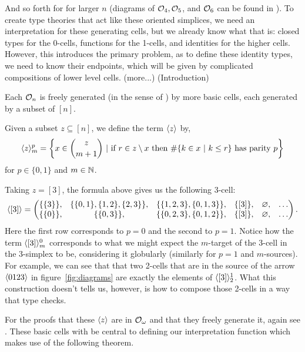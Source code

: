 \documentclass{article}
\begin{document}
And so forth for for larger $n$ (diagrams of $\mathcal{O}_4,\mathcal{O}_5$, and $\mathcal{O}_6$ can be found in \cite{Street}). To create type theories that act like these oriented simplices, we need an interpretation for these generating cells, but we already know what that is: closed types for the 0-cells, functions for the 1-cells, and identities for the higher cells. However, this introduces the primary problem, as to define these identity types, we need to know their endpoints, which will be given by complicated compositions of lower level cells. (more...) (Introduction)

Each $\mathcal{O}_n$ is freely generated (in the sense of \cite[\S 4]{Street}) by more basic cells, each generated by a subset of $[n]$.

\begin{defn}
    Given a subset $z\subseteq[n]$, we define the term $\langle z\rangle$ by,
    $$ \gen{z}_m^p=\left\{x\in{\binom z{m+1}}\ |\ \text{if }r\in z\setminus x\text{ then }\#\{k\in x\ |\ k\leq r\}\text{ has parity }p\right\} $$
    for $p\in\{0,1\}$ and $m\in\mathbb{N}$.
\end{defn}

\begin{ex}
    Taking $z=[3]$, the formula above gives us the following 3-cell:
    $$ \langle[3]\rangle=\begin{pmatrix}
        \{\{3\}\}, & \{\{0,1\},\{1,2\},\{2,3\}\}, & \{\{1,2,3\},\{0,1,3\}\}, & \{[3]\}, & \varnothing, & \dots\\
        \{\{0\}\}, & \{\{0,3\}\}, & \{\{0,2,3\},\{0,1,2\}\}, & \{[3]\}, & \varnothing, & \dots\\
    \end{pmatrix}. $$
    Here the first row corresponds to $p=0$ and the second to $p=1$. Notice how the term $\langle[3]\rangle_m^0$ corresponds to what we might expect the $m$-target of the 3-cell in the 3-simplex to be, considering it globularly (similarly for $p=1$ and $m$-sources). For example, we can see that that two 2-cells that are in the source of the arrow $\langle0123\rangle$ in figure~\ref{fig:diagrams} are exactly the elements of $\langle[3]\rangle_2^1$. What this construction doesn't tells us, however, is how to compose those 2-cells in a way that type checks.
\end{ex}


For the proofs that these $\langle z\rangle$ are in $\mathcal{O}_\omega$ and that they freely generate it, again see \cite{Street}. These basic cells with be central to defining our interpretation function which makes use of the following theorem.
\end{document}
